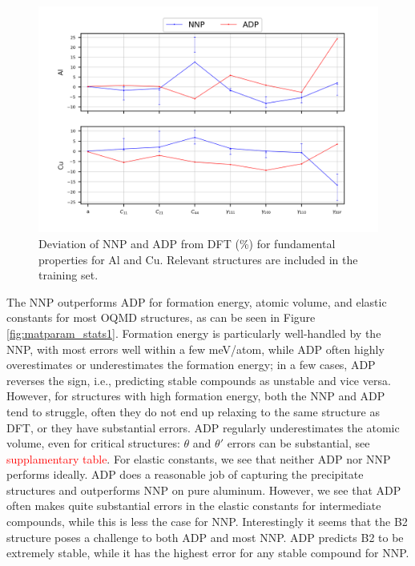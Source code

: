 \documentclass{article}
\begin{document}
\begin{figure}[H]%
\centering%
\includegraphics[width=1.2\textwidth,center]{./figures/matparam_purestats.png}%
\caption{Deviation of NNP and ADP from DFT (\%) for fundamental properties for Al and Cu. 
Relevant structures are included in the training set. }%
\label{fig:matparam_purestats}
\end{figure}
The NNP outperforms ADP for formation energy, atomic volume, and elastic constants for most OQMD structures, as can be seen in Figure \ref{fig:matparam_stats1}.
Formation energy is particularly well-handled by the NNP, with most errors well within a few meV/atom, while ADP often highly overestimates or underestimates the formation energy;
in a few cases, ADP reverses the sign, i.e., predicting stable compounds as unstable and vice versa.
However, for structures with high formation energy, both the NNP and ADP tend to struggle, often they do not end up relaxing to the same structure as DFT, or they have substantial errors.
ADP regularly underestimates the atomic volume, even for critical structures: $\theta$ and $\theta'$ errors can be substantial, see \textcolor{red}{supplamentary table}.
For elastic constants, we see that neither ADP nor NNP performs ideally.
ADP does a reasonable job of capturing the precipitate structures and outperforms NNP on pure aluminum.
However, we see that ADP often makes quite substantial errors in the elastic constants for intermediate compounds, while this is less the case for NNP. Interestingly it seems that the B2 structure poses a challenge to both ADP and most NNP.
ADP predicts B2 to be extremely stable, while it has the highest error for any stable compound for NNP. 
\end{document}
